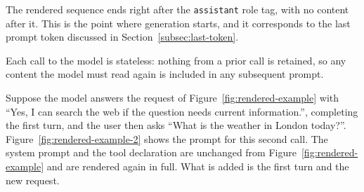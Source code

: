 The rendered sequence ends right after the \texttt{assistant} role tag, with no content after it. This is the point where generation starts, and it corresponds to the last prompt token discussed in Section~\ref{subsec:last-token}.

Each call to the model is stateless: nothing from a prior call is retained, so any content the model must read again is included in any subsequent prompt.

Suppose the model answers the request of Figure~\ref{fig:rendered-example} with ``Yes, I can search the web if the question needs current information.'', completing the first turn, and the user then asks ``What is the weather in London today?''. Figure~\ref{fig:rendered-example-2} shows the prompt for this second call. The system prompt and the tool declaration are unchanged from Figure~\ref{fig:rendered-example} and are rendered again in full. What is added is the first turn and the new request.

